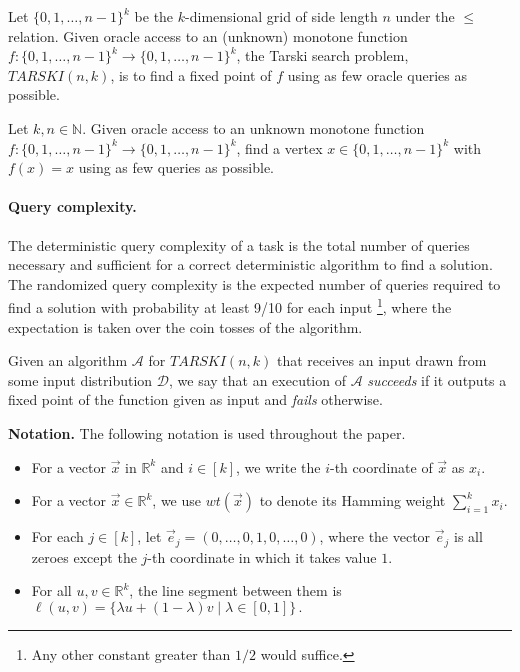 \documentclass[11pt]{article}
\begin{document}
Let $\{0, 1, \ldots, n-1\}^k$ be the $k$-dimensional grid of side length $n$ under the $\leq$ relation.  Given oracle access to an (unknown) monotone function $f: \{0,1,\ldots, n-1\}^k \to \{0,1,\ldots, n-1\}^k$, the Tarski search problem,  ${TARSKI}(n,k)$, is to find a fixed point of $f$ using as few oracle queries as possible.

\begin{definition} [${TARSKI}(n,k)$]
Let $k,n \in \mathbb{N}$.
     Given oracle access to an unknown monotone function $f : \{0, 1, \ldots, n-1\}^k \to \{0, 1, \ldots, n-1\}^k$, find a vertex $x \in \{0, 1, \ldots, n-1\}^k$ with $f(x) = x$ using as few queries as possible.
 \end{definition}

\paragraph{Query complexity.} The deterministic query complexity of a task is the total number of queries necessary and sufficient for a correct deterministic algorithm to find a solution. The randomized query complexity is the expected number of queries required to find a solution with probability at least 9/10 for each input \footnote{Any other constant greater than $1/2$ would suffice.}, where the expectation is taken over the coin tosses of the algorithm.

Given an algorithm $\mathcal{A}$ for $TARSKI(n,k)$ that receives an input drawn from some input  distribution $\mathcal{D}$, we say that an execution of $\mathcal{A}$ \emph{succeeds} if it outputs a fixed point of the function given as input and \emph{fails} otherwise.

\medskip 

\noindent \textbf{Notation.} The following notation is used throughout the paper. 
\begin{itemize}
    \item For a vector $\vec{x}$ in $\mathbb{R}^k$ and $i \in [k]$, we write the $i$-th coordinate of $\vec{x}$ as $x_i$.
    \item For a vector $\vec{x} \in \mathbb{R}^k$, we use $wt(\vec{x})$ to denote its Hamming weight $\sum_{i=1}^k x_i$.
    \item For each $j \in [k]$, let
        $\vec{e}_j = (0, \ldots, 0, 1, 0, \ldots, 0)$,
    where the vector $\vec{e}_j$ is all zeroes except the $j$-th coordinate in which it takes value $1$.
    \item For all $u, v \in \mathbb{R}^k$,  the line segment between them is 
        $\ell(u, v) = \bigl\{ \lambda u + (1-\lambda)v \mid \lambda \in [0, 1] \bigr\} \,. $ 
\end{itemize}
\end{document}
